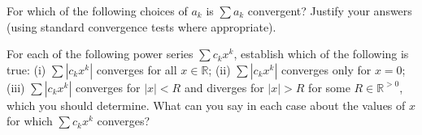 \documentclass[answers]{exam}
\begin{document}
\begin{questions}
\question%
For which of the following choices of $a_{k}$ is $\sum a_{k}$ convergent? Justify your answers (using standard convergence tests where appropriate).



\question%
For each of the following power series $\sum c_{k} x^{k}$, establish which of the following is true: (i) $\sum\left|c_{k} x^{k}\right|$ converges for all $x \in \mathbb{R}$; (ii) $\sum\left|c_{k} x^{k}\right|$ converges only for $x=0$; (iii) $\sum\left|c_{k} x^{k}\right|$ converges for $|x|<R$ and diverges for $|x|>R$ for some $R \in \mathbb{R}^{>0}$, which you should determine. What can you say in each case about the values of $x$ for which $\sum c_{k} x^{k}$ converges?
\end{questions}
\end{document}
